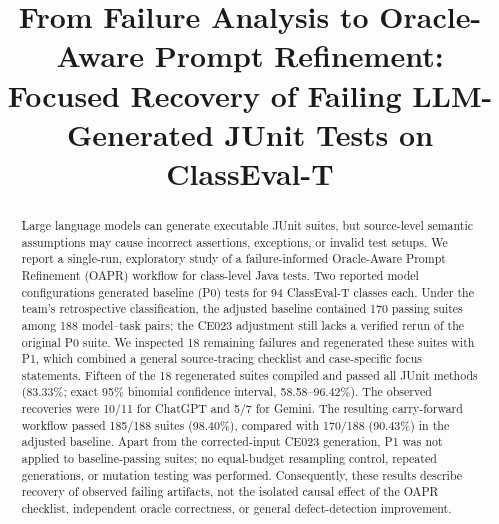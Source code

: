 \documentclass[conference]{IEEEtran}
\begin{document}
\title{From Failure Analysis to Oracle-Aware Prompt Refinement:\\
Focused Recovery of Failing LLM-Generated JUnit Tests on ClassEval-T}

\author{
}

\maketitle

\begin{abstract}
Large language models can generate executable JUnit suites, but source-level semantic assumptions may cause incorrect assertions, exceptions, or invalid test setups. We report a single-run, exploratory study of a failure-informed Oracle-Aware Prompt Refinement (OAPR) workflow for class-level Java tests. Two reported model configurations generated baseline (P0) tests for 94 ClassEval-T classes each. Under the team's retrospective classification, the adjusted baseline contained 170 passing suites among 188 model--task pairs; the CE023 adjustment still lacks a verified rerun of the original P0 suite. We inspected 18 remaining failures and regenerated these suites with P1, which combined a general source-tracing checklist and case-specific focus statements. Fifteen of the 18 regenerated suites compiled and passed all JUnit methods (83.33\%; exact 95\% binomial confidence interval, 58.58--96.42\%). The observed recoveries were 10/11 for ChatGPT and 5/7 for Gemini. The resulting carry-forward workflow passed 185/188 suites (98.40\%), compared with 170/188 (90.43\%) in the adjusted baseline. Apart from the corrected-input CE023 generation, P1 was not applied to baseline-passing suites; no equal-budget resampling control, repeated generations, or mutation testing was performed. Consequently, these results describe recovery of observed failing artifacts, not the isolated causal effect of the OAPR checklist, independent oracle correctness, or general defect-detection improvement.
\end{abstract}
\end{document}
